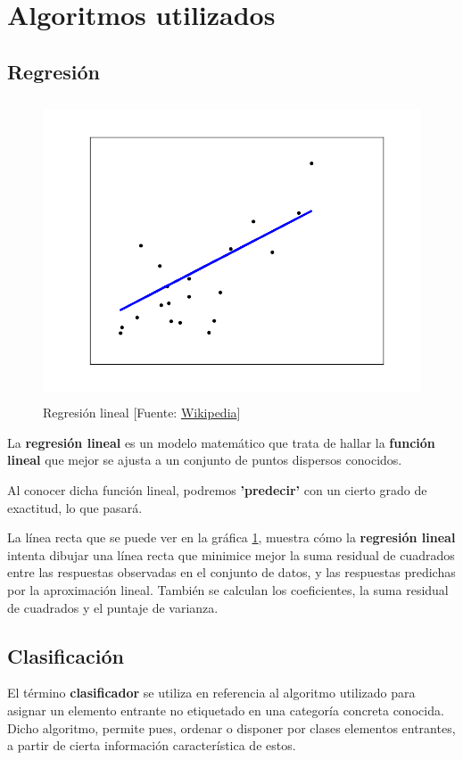 \section{Algoritmos utilizados}
\label{makereference4.3}
	\subsection{Regresión}
	\label{makereference4.3.1}
	\begin{figure}[htb]
		
		\begin{center}
			\includegraphics[height=3.5in]{figures/regression.png}
			\caption{Regresión lineal [Fuente: \href{www.wikipedia.org}{Wikipedia}]}
		\end{center}
		
		\label{regression}
	\end{figure}

	La \textbf{regresión lineal} es un modelo matemático que trata de hallar la \textbf{función lineal} que mejor se ajusta a un conjunto de puntos dispersos conocidos.
	
	Al conocer dicha función lineal, podremos \textbf{'predecir'} con un cierto grado de exactitud, lo que pasará.
	
	La línea recta que se puede ver en la gráfica \ref{regression}, muestra cómo la \textbf{regresión lineal} intenta dibujar una línea recta que minimice mejor la suma residual de cuadrados entre las respuestas observadas en el conjunto de datos, y las respuestas predichas por la aproximación lineal.
	También se calculan los coeficientes, la suma residual de cuadrados y el puntaje de varianza.
	
	\subsection{Clasificación}
	\label{makereference4.3.2}
	El término \textbf{clasificador} se utiliza en referencia al algoritmo utilizado para asignar un elemento entrante no etiquetado en una categoría concreta conocida. Dicho algoritmo, permite pues, ordenar o disponer por clases elementos entrantes, a partir de cierta información característica de estos.
	
